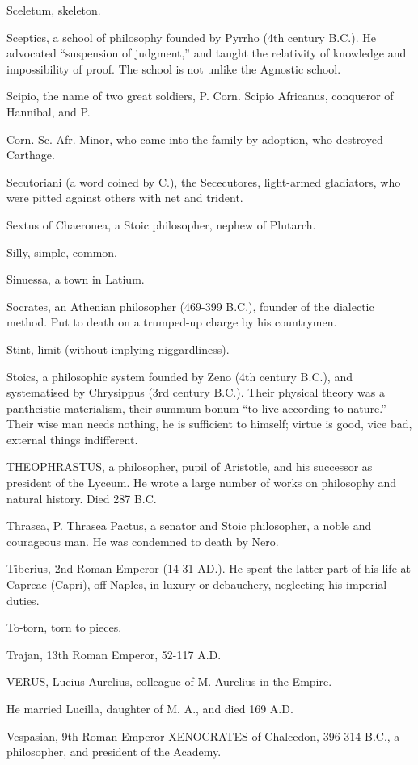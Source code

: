 Sceletum, skeleton.

Sceptics, a school of philosophy founded by Pyrrho (4th century B.C.). He
advocated ``suspension of judgment,'' and taught the relativity of knowledge
and impossibility of proof. The school is not unlike the Agnostic school.

Scipio, the name of two great soldiers, P. Corn. Scipio Africanus,
conqueror of Hannibal, and P.

Corn. Sc. Afr. Minor, who came into the family by adoption, who destroyed
Carthage.

Secutoriani (a word coined by C.), the Sececutores, light-armed
gladiators, who were pitted against others with net and trident.

Sextus of Chaeronea, a Stoic philosopher, nephew of Plutarch.

Silly, simple, common.

Sinuessa, a town in Latium.

Socrates, an Athenian philosopher (469-399 B.C.), founder of the dialectic
method. Put to death on a trumped-up charge by his countrymen.

Stint, limit (without implying niggardliness).

Stoics, a philosophic system founded by Zeno (4th century B.C.), and
systematised by Chrysippus (3rd century B.C.). Their physical theory was a
pantheistic materialism, their summum bonum ``to live according to nature.''
Their wise man needs nothing, he is sufficient to himself; virtue is good,
vice bad, external things indifferent.

THEOPHRASTUS, a philosopher, pupil of Aristotle, and his successor as
president of the Lyceum. He wrote a large number of works on philosophy
and natural history. Died 287 B.C.

Thrasea, P. Thrasea Pactus, a senator and Stoic philosopher, a noble and
courageous man. He was condemned to death by Nero.

Tiberius, 2nd Roman Emperor (14-31 AD.). He spent the latter part of his
life at Capreae (Capri), off Naples, in luxury or debauchery, neglecting
his imperial duties.

To-torn, torn to pieces.

Trajan, 13th Roman Emperor, 52-117 A.D.

VERUS, Lucius Aurelius, colleague of M. Aurelius in the Empire.

He married Lucilla, daughter of M. A., and died 169 A.D.

Vespasian, 9th Roman Emperor XENOCRATES of Chalcedon, 396-314 B.C., a
philosopher, and president of the Academy.

